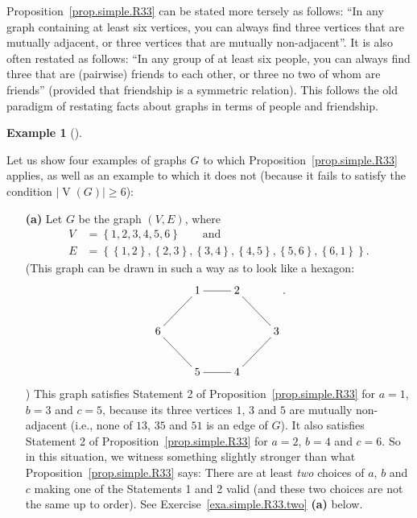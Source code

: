 \documentclass[numbers=enddot,12pt,final,onecolumn,notitlepage]{scrartcl}%
\makeatletter
\theoremstyle{definition}
\newtheorem{exam}[theo]{Example}
\newenvironment{example}[1][]
{\begin{exam}[#1]\begin{leftbar}}
{\end{leftbar}\end{exam}}
\newcommand{\set}[1]{\left\{ #1 \right\}}
\newcommand{\abs}[1]{\left| #1 \right|}
\newcommand{\tup}[1]{\left( #1 \right)}
\newcommand{\verts}[1]{\operatorname{V}\left( #1 \right)}
\newcommand{\are}{\ar@{-}}
\makeatother
\begin{document}
Proposition~\ref{prop.simple.R33} can be stated more tersely as
follows: ``In any graph containing at least six vertices, you can
always find three vertices that are mutually adjacent, or three
vertices that are mutually non-adjacent''. It is also often restated
as follows:
``In any group of at least six people, you can always find three that
are (pairwise) friends to each other, or three no two of whom are
friends'' (provided that friendship is a symmetric relation). This
follows the old paradigm of restating facts about graphs in terms of
people and friendship.

\begin{example} \label{exa.simple.R33}
Let us show four examples of graphs $G$ to which
Proposition~\ref{prop.simple.R33} applies, as well as an example to
which it does not (because it fails to satisfy the condition
$\abs{\verts{G}} \geq 6$):

\begin{enumerate}

\item[\textbf{(a)}] Let $G$ be the graph $\tup{V, E}$, where
\begin{align*}
V &= \set{1, 2, 3, 4, 5, 6} \qquad \text{and} \\
E &= \set{\set{1,2}, \set{2,3}, \set{3,4}, \set{4,5}, \set{5,6},
          \set{6,1}} .
\end{align*}
(This graph can be drawn in such a way as to look like a hexagon:
\begin{align*}
\xymatrix{
& 1 \are[r] & 2 \are[rd] \\
6 \are[ru] & & & 3 \are[ld] \\
& 5 \are[lu] & 4 \are[l]
} .
\end{align*}
)
This graph satisfies Statement 2 of Proposition~\ref{prop.simple.R33}
for $a=1$, $b=3$ and $c=5$,
because its three vertices $1$, $3$ and $5$ are mutually
non-adjacent (i.e., none of $13$, $35$ and $51$ is an edge of $G$).
It also satisfies Statement 2 of Proposition~\ref{prop.simple.R33}
for $a=2$, $b=4$ and $c=6$.
So in this situation, we witness something slightly stronger than what
Proposition~\ref{prop.simple.R33} says: There are at least
\textit{two} choices of $a$, $b$ and $c$ making one of the Statements
1 and 2 valid (and these two choices are not the same up to order).
See Exercise~\ref{exa.simple.R33.two} \textbf{(a)} below.


\end{enumerate}
\end{example}
\end{document}
